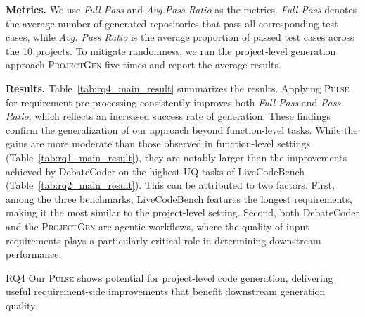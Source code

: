 \noindent\textbf{Metrics.} We use \emph{Full Pass} and \emph{Avg.Pass Ratio} as the metrics. \emph{Full Pass} denotes the average number of generated repositories that pass all corresponding test cases,  while \emph{Avg. Pass Ratio} is the average proportion of passed test cases across the 10 projects. To mitigate randomness, we run the project-level generation approach \textsc{ProjectGen} five times and report the average results.

\noindent \textbf{Results.}
Table~\ref{tab:rq4_main_result} summarizes the results. Applying \textsc{Pulse} for requirement pre-processing consistently improves both \emph{Full Pass} and \emph{Pass Ratio}, which reflects an increased success rate of generation. These findings confirm the generalization of our approach beyond function-level tasks.  While the gains are more moderate than those observed in function-level settings (Table~\ref{tab:rq1_main_result}), they are notably larger than the improvements achieved by DebateCoder on the highest-UQ tasks of LiveCodeBench (Table~\ref{tab:rq2_main_result}). This can be attributed to two factors. First, among the three benchmarks, LiveCodeBench features the longest requirements, making it the most similar to the project-level setting. Second, both DebateCoder and the \textsc{ProjectGen} are agentic workflows, where the quality of input requirements plays a particularly critical role in determining downstream performance.




\begin{rqsummary}{RQ4}
    Our \textsc{Pulse} shows potential for project-level code generation, delivering useful requirement-side improvements that benefit downstream generation quality.
\end{rqsummary}